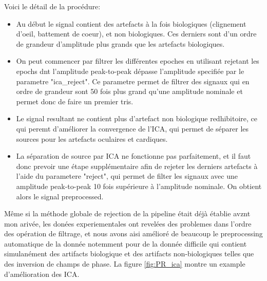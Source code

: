 Voici le détail de la procédure:
\begin{itemize}
    \item Au début le signal contient des artefacts à la fois biologiques (clignement d'oeil, battement de coeur), et non biologiques. Ces derniers sont d'un ordre de grandeur d'amplitude plus grands que les artefacts biologiques.
    \item On peut commencer par filtrer les différentes epoches en utilisant rejetant les epochs dnt l'amplitude peak-to-peak dépasse l'amplitude specifiée par le parametre "ica\_reject". Ce parametre permet de filtrer des signaux qui en ordre de grandeur sont 50 fois plus grand qu'une amplitude nominale et permet donc de faire un premier tris.
    \item Le signal resultant ne contient plus d'artefact non biologique redhibitoire, ce qui peremt d'améliorer la convergence de l'ICA, qui permet de séparer les sources pour les artefacts oculaires et cardiques.
    \item La séparation de source par ICA ne fonctionne pas parfaitement, et il faut donc prevoir une étape supplémentaire afin de rejeter les derniers artefacts à l'aide du parametere "reject", qui permet de filter les signaux avec une amplitude peak-to-peak 10 fois supérieure à l'amplitude nominale. On obtient alors le signal preprocessed.
\end{itemize}

Même si la méthode globale de rejection de la pipeline était déjà établie avznt mon arivée, les donées experiementales ont revelées des problemes dans l'ordre des opération de filtrage, et nous avons aisi amélioré de beaucoup le preprocessing automatique de la donnée notemment pour de la donnée difficile qui contient simulanément des artifacts biologique et des artifacts non-biologiques telles que des inversion de champs de phase. La figure \ref{fig:PR_ica} montre un example d'amélioration des ICA.



